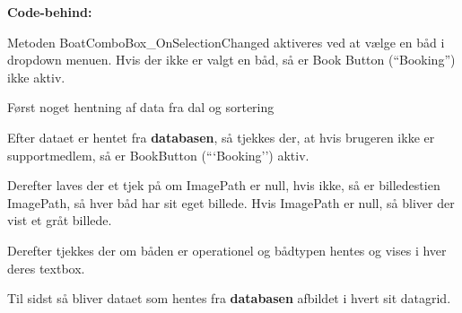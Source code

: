 \textbf{Code-behind:}

Metoden BoatComboBox_OnSelectionChanged aktiveres ved at vælge en båd i dropdown menuen. 
Hvis der ikke er valgt en båd, så er Book Button (``Booking'') ikke aktiv. 

Først noget hentning af data fra dal og sortering

Efter dataet er hentet fra \textbf{databasen}, så tjekkes der, at hvis brugeren ikke er supportmedlem, så er BookButton (```Booking'') aktiv. 

Derefter laves der et tjek på om ImagePath er null, hvis ikke, så er billedestien ImagePath, så hver båd har sit eget billede. 
Hvis ImagePath er null, så bliver der vist et gråt billede.

Derefter tjekkes der om båden er operationel og bådtypen hentes og vises i hver deres textbox. 

Til sidst så bliver dataet som hentes fra \textbf{databasen} afbildet i hvert sit datagrid.

